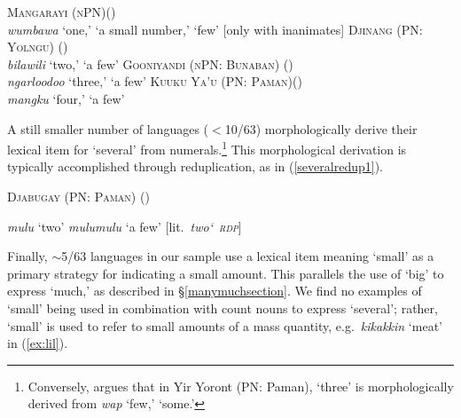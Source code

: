 \documentclass[12pt,egregdoesnotlikesansseriftitles]{scrartcl}
\begin{document}
\begin{exe}
\ex \textsc{Mangarayi (nPN)}\hfill (\citealt[93]{merlan89})\\
\textit{wumbawa} `one,' `a small number,' `few' [only with inanimates] \label{fewex0}
  \ex \textsc{Djinang (PN: Yolngu)} \hfill(\citealt[9]{waters83})\\
  \textit{bilawili} `two,' `a few' \label{fewex1}
  \ex \textsc{Gooniyandi (nPN: Bunaban)} \hfill (\citealt[149]{mcgregor90}) \label{fewex2}\\
  \textit{ngarloodoo} `three,' `a few'
  \ex \textsc{Kuuku Ya'u (PN: Paman)}\hfill (\citealt[27,82]{thompson88})\\
  \textit{mangku} `four,' `a few' \label{fewex3}
\end{exe}

A still smaller number of languages ($<$10/63) morphologically derive their lexical item for `several' from numerals.\footnote{Conversely, \citet[51]{alpher73} argues that in Yir Yoront (PN: Paman), \textit{} `three' is morphologically derived from \textit{wap} `few,' `some.'} This morphological derivation is typically accomplished through reduplication, as in (\ref{severalredup1}).


\begin{exe}
    \ex \textsc{Djabugay (PN: Paman)} \hfill (\citealt[87]{patz91}) \label{severalredup1}
  \begin{xlist}
    \ex \textit{mulu} `two'
    \ex \textit{mulumulu} `a few' [lit.\ \textit{two\char`~\textsc{rdp}}]
  \end{xlist}
\end{exe}

Finally, $\sim$5/63 languages in our sample use a lexical item meaning `small' as a primary strategy for indicating a small amount. This parallels the use of `big' to express `much,' as described in \S\ref{manymuchsection}. We find no examples of `small' being used in combination with count nouns to express `several'; rather, `small' is used to refer to small amounts of a mass quantity, e.g.\ \textit{kikakkin} `meat' in (\ref{ex:lil}). 
\end{document}
